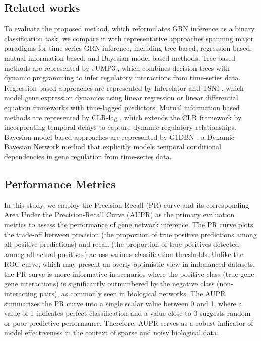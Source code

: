 \subsection{Related works}
To evaluate the proposed method, which reformulates GRN inference as a binary classification task, we compare it with representative approaches spanning major paradigms for time-series GRN inference, including tree based, regression based, mutual information based, and Bayesian model based methods. Tree based methods are represented by JUMP3 \parencite{HuynhThu2015}, which combines decision trees with dynamic programming to infer regulatory interactions from time-series data. Regression based approaches are represented by Inferelator \parencite{greenfield2010dream4} and TSNI \parencite{bansal2006inference}, which model gene expression dynamics using linear regression or linear differential equation frameworks with time-lagged predictors. Mutual information based methods are represented by CLR-lag \parencite{faith2007}, which extends the CLR framework by incorporating temporal delays to capture dynamic regulatory relationships. Bayesian model based approaches are represented by G1DBN \parencite{Lebre2007}, a Dynamic Bayesian Network method that explicitly models temporal conditional dependencies in gene regulation from time-series data.

\subsection{Performance Metrics}\label{metrics}
In this study, we employ the Precision-Recall (PR) curve and its corresponding Area Under the Precision-Recall Curve (AUPR) as the primary evaluation metrics to assess the performance of gene network inference. The PR curve plots the trade-off between precision (the proportion of true positive predictions among all positive predictions) and recall (the proportion of true positives detected among all actual positives) across various classification thresholds. Unlike the ROC curve, which may present an overly optimistic view in imbalanced datasets, the PR curve is more informative in scenarios where the positive class (true gene-gene interactions) is significantly outnumbered by the negative class (non-interacting pairs), as commonly seen in biological networks. The AUPR summarizes the PR curve into a single scalar value between 0 and 1, where a value of 1 indicates perfect classification and a value close to 0 suggests random or poor predictive performance. Therefore, AUPR serves as a robust indicator of model effectiveness in the context of sparse and noisy biological data.
